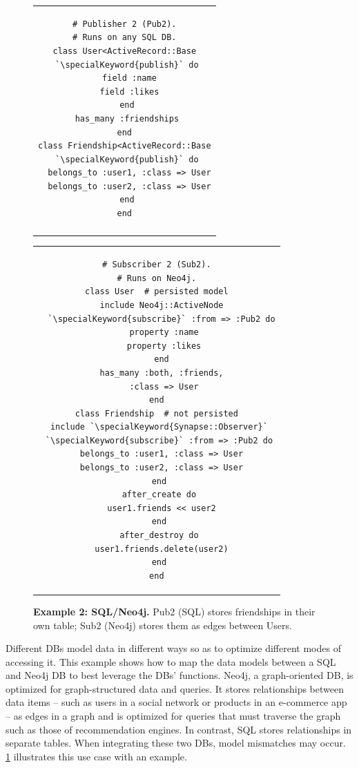 \begin{figure}
\begin{tabular}{c}
\begin{minipage}{.23\textwidth}
\begin{lstlisting}[xleftmargin=3pt]
# Publisher 2 (Pub2).
# Runs on any SQL DB.
class User<ActiveRecord::Base
 `\specialKeyword{publish}` do
  field :name
  field :likes
 end
 has_many :friendships
end
class Friendship<ActiveRecord::Base
 `\specialKeyword{publish}` do
  belongs_to :user1, :class => User
  belongs_to :user2, :class => User
 end
end
\end{lstlisting}
\end{minipage}\\
\begin{minipage}{.21\textwidth}
\vspace{0.2cm}
\caption{{\bf Example 2: SQL/Neo4j.}
Pub2 (SQL) stores friendships in their own table; Sub2 (Neo4j) stores
them as edges between Users. }
\vspace{-0.2cm}
\label{fig:sql-to-neo4j}
\end{minipage}
\end{tabular}\hfill
\begin{tabular}{c}
\begin{minipage}{.21\textwidth}
\begin{lstlisting}
# Subscriber 2 (Sub2).
# Runs on Neo4j.
class User  # persisted model
  include Neo4j::ActiveNode
  `\specialKeyword{subscribe}` :from => :Pub2 do
   property :name
   property :likes
  end
  has_many :both, :friends,
   :class => User
end
class Friendship  # not persisted
 include `\specialKeyword{Synapse::Observer}`
 `\specialKeyword{subscribe}` :from => :Pub2 do
  belongs_to :user1, :class => User
  belongs_to :user2, :class => User
 end
 after_create do
  user1.friends << user2
 end
 after_destroy do
  user1.friends.delete(user2)
 end
end
\end{lstlisting}
\end{minipage}
\end{tabular}
\end{figure}

Different DBs model data in different ways so as to optimize different modes of
accessing it. This example shows how to map the data models between a SQL and
Neo4j DB to best leverage the DBs' functions.  Neo4j, a graph-oriented DB, is
optimized for graph-structured data and queries. It stores relationships between
data items -- such as users in a social network or products in an e-commerce app
-- as edges in a graph and is optimized for queries that must traverse the graph
such as those of recommendation engines. In contrast, SQL stores relationships
in separate tables. When integrating these two DBs, model mismatches may occur.
\F\ref{fig:sql-to-neo4j} illustrates this use case with an example.

